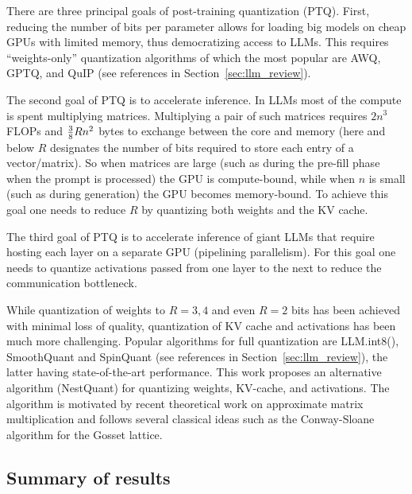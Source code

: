 There are three principal goals of post-training quantization (PTQ). First, reducing the number of bits per parameter allows for loading big models on cheap GPUs with limited memory, thus democratizing access to LLMs. This requires ``weights-only'' quantization algorithms of which the most popular are AWQ, GPTQ, and QuIP (see references in Section~\ref{sec:llm_review}). 

The second goal of PTQ is to accelerate inference. In LLMs most of the compute is spent multiplying matrices. Multiplying a pair of such matrices requires $2n^3$ FLOPs and ${3\over 8}Rn^2$ bytes to exchange between the core and memory (here and below $R$ designates the number of bits required to store each entry of a vector/matrix). So when matrices are large (such as during the pre-fill phase when the prompt is processed) the GPU is compute-bound, while when $n$ is small (such as during generation) the GPU becomes memory-bound. To achieve this goal one needs to reduce $R$ by quantizing both weights and the KV cache.

The third goal of PTQ is to accelerate inference of giant LLMs that require hosting each layer on
a separate GPU (pipelining parallelism). For this goal one needs to quantize activations passed
from one layer to the next to reduce the communication bottleneck.

While quantization of weights to $R=3,4$ and even $R=2$ bits has been achieved with minimal loss of quality, quantization of KV cache and activations has been much more challenging. 
Popular algorithms for full quantization are LLM.int8(), SmoothQuant and SpinQuant (see references in Section~\ref{sec:llm_review}),  the latter having state-of-the-art performance. This work proposes an alternative algorithm (NestQuant) for quantizing weights, KV-cache, and activations. The algorithm is motivated by recent theoretical work on approximate matrix multiplication and follows several classical ideas such as the Conway-Sloane algorithm for the Gosset lattice. 

\subsection{Summary of results}

